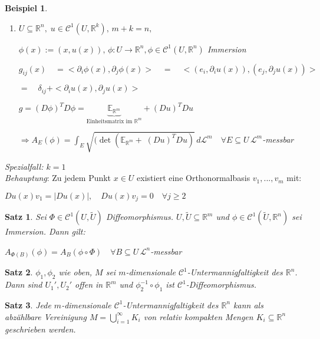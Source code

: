 \documentclass[11pt]{memoir}
\theoremstyle{changebreak}
\newtheorem{Beispiel}{Beispiel}[chapter]
\newtheorem{Satz}{Satz}[chapter]
\begin{document}
\begin{Beispiel}
\begin{enumerate}
	\item $U \subseteq \mathbb R^n, \;u \in \mathscr C^1(U, \mathbb R^k), \, m+k =n,$
	\par
	$ \phi(x) := (x, u(x)), \, \phi: U \rightarrow \mathbb R^n, \phi \in \mathscr C^1(U, \mathbb R^n)$ Immersion 
	\par
	$g_{ij}(x) \quad = <\partial_i \phi(x), \partial_j \phi(x)> \quad=\quad <(e_i, \partial_i u(x)), (e_j, \partial_j u(x))> \quad$
	\par
	$= \quad \delta_{ij} + <\partial_i u(x), \partial_j u(x)> $ 
	\par
	$g = (D\phi)^T D\phi = \underbrace{\mathbb E_{\mathbb R^m}}_{\text{Einheitsmatrix im }\mathbb R^m} + (Du)^TDu$  \\%
	\par\bigskip
	$\Rightarrow A_E(\phi) = \int_E \sqrt{(\det(\mathbb E_{\mathbb R^m} +\; (Du)^TDu)}\,d\mathscr L^m \quad \forall E \subseteq U\, \mathscr L^m$-messbar
\end{enumerate}
\end{Beispiel}

\par\bigskip
\emph{Spezialfall: $k=1$} \\
\emph{Behauptung}: Zu jedem Punkt $x \in U$ existiert eine Orthonormalbasis $v_1, ... , v_m$ mit:
\begin{center}
	$Du(x) v_1 = |Du(x)|, \quad Du(x) v_j = 0\quad \forall j \geq 2$
\end{center}


\begin{Satz}
Sei $\Phi \in \mathscr C^1(U, \tilde U)$ Diffeomorphismus. $U, \tilde U \subseteq \mathbb R^m$ und $\phi \in \mathscr C^1(\tilde U, \mathbb R^n)$ sei Immersion. Dann gilt:
\begin{center}
	$A_{\Phi(B)}(\phi) = A_B (\phi \circ \Phi) \quad \forall B \subseteq U \, \mathscr L^n$-messbar
\end{center}
\end{Satz}

\begin{Satz}
$\phi_1, \phi_2$ wie oben, $M$ sei $m$-dimensionale $\mathscr C^1$-Untermannigfaltigkeit des $\mathbb R^n$. Dann sind $U_1 ', U_2 '$ offen in $\mathbb R^m$ und $\phi_2^{-1}\circ \phi_1$ ist $\mathscr C^1$-Diffeomorphismus.
\end{Satz}

\begin{Satz}
Jede $m$-dimensionale $\mathscr C^1$-Untermannigfaltigkeit des $\mathbb R^n$ kann als abzählbare Vereinigung $M = \bigcup\limits_{i=1}^\infty K_i$ von relativ kompakten Mengen $K_i \subseteq \mathbb R^n$ geschrieben werden.
\end{Satz}
\end{document}
